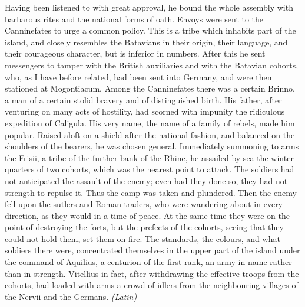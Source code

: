Having been listened to with great approval, he bound the whole assembly with barbarous rites and the national forms of oath. Envoys were sent to the Canninefates to urge a common policy. This is a tribe which inhabits part of the island, and closely resembles the Batavians in their origin, their language, and their courageous character, but is inferior in numbers. After this he sent messengers to tamper with the British auxiliaries and with the Batavian cohorts, who, as I have before related, had been sent into Germany, and were then stationed at Mogontiacum. Among the Canninefates there was a certain Brinno, a man of a certain stolid bravery and of distinguished birth. His father, after venturing on many acts of hostility, had scorned with impunity the ridiculous expedition of Caligula. His very name, the name of a family of rebels, made him popular. Raised aloft on a shield after the national fashion, and balanced on the shoulders of the bearers, he was chosen general. Immediately summoning to arms the Frisii, a tribe of the further bank of the Rhine, he assailed by sea the winter quarters of two cohorts, which was the nearest point to attack. The soldiers had not anticipated the assault of the enemy; even had they done so, they had not strength to repulse it. Thus the camp was taken and plundered. Then the enemy fell upon the sutlers and Roman traders, who were wandering about in every direction, as they would in a time of peace. At the same time they were on the point of destroying the forts, but the prefects of the cohorts, seeing that they could not hold them, set them on fire. The standards, the colours, and what soldiers there were, concentrated themselves in the upper part of the island under the command of Aquilius, a centurion of the first rank, an army in name rather than in strength. Vitellius in fact, after withdrawing the effective troops from the cohorts, had loaded with arms a crowd of idlers from the neighbouring villages of the Nervii and the Germans. \emph{(Latin)}


